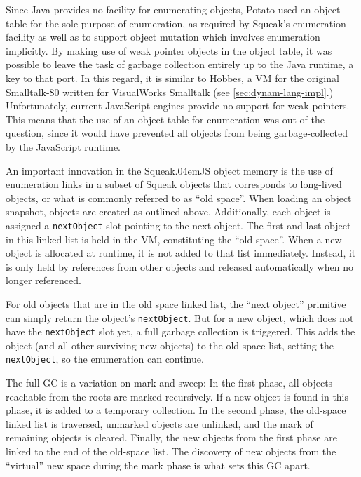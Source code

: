 \documentclass[natbib]{sigplanconf}
\newcommand*\SqueakJS{Squeak\texorpdfstring{\kern.04em}{}JS\xspace}
\newcommand*\JS{JavaScript\xspace}
\begin{document}
Since Java provides no facility for enumerating objects, Potato used
an object table for the sole purpose of enumeration, as required by
Squeak's enumeration facility as well as to support object mutation
which involves enumeration implicitly. By making use of weak pointer
objects in the object table, it was possible to leave the task of
garbage collection entirely up to the Java runtime, a key to that
port. In this regard, it is similar to Hobbes, a \ac{VM} for the
original Smalltalk-80 written for VisualWorks Smalltalk (see
\autoref{sec:dynam-lang-impl}.) Unfortunately, current \JS engines
provide no support for weak pointers. This means that the use of an
object table for enumeration was out of the question, since it would
have prevented all objects from being garbage-collected by the \JS
runtime.

An important innovation in the \SqueakJS object memory is the use of
enumeration links in a subset of Squeak objects that corresponds to
long-lived objects, or what is commonly referred to as ``old space''.
When loading an object snapshot, objects are created as outlined
above.  Additionally, each object is assigned a \lstinline|nextObject|
slot pointing to the next object. The first and last object in this
linked list is held in the VM, constituting the ``old space''. When a
new object is allocated at runtime, it is not added to that list
immediately. Instead, it is only held by references from other objects
and released automatically when no longer referenced.

For old objects that are in the old space linked list, the ``next
object'' primitive can simply return the object's
\lstinline|nextObject|. But for a new object, which does not have the
\lstinline|nextObject| slot yet, a full garbage collection is
triggered. This adds the object (and all other surviving new objects)
to the old-space list, setting the \lstinline|nextObject|, so the
enumeration can continue.

The full \ac{GC} is a variation on mark-and-sweep: In the first phase,
all objects reachable from the roots are marked recursively. If a new
object is found in this phase, it is added to a temporary collection.
In the second phase, the old-space linked list is traversed, unmarked
objects are unlinked, and the mark of remaining objects is cleared.
Finally, the new objects from the first phase are linked to the end of
the old-space list. The discovery of new objects from the ``virtual''
new space during the mark phase is what sets this \ac{GC} apart.
\end{document}
